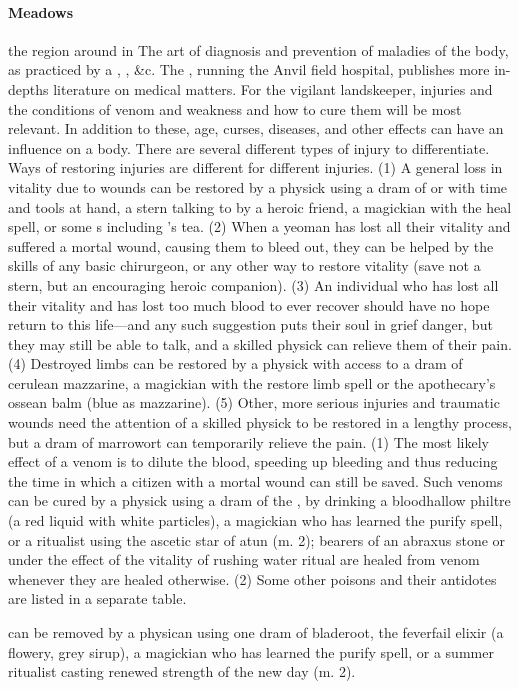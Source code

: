 \paragraph{Meadows} the region around  in 
 The art of diagnosis and prevention of maladies of the body, as practiced by a , ,  \&c. The , running the Anvil field hospital, publishes more in-depths literature on medical matters. For the vigilant landskeeper, injuries and the conditions of venom and weakness and how to cure them will be most relevant. In addition to these, age, curses, diseases, and other effects can have an influence on a body. \localpar {} There are several different types of injury to differentiate. Ways of restoring injuries are different for different injuries. (1) A general loss in vitality due to wounds can be restored by a physick using a dram of  or with time and tools at hand, a stern talking to by a heroic friend, a magickian with the heal spell, or some s including 's tea. (2) When a yeoman has lost all their vitality and suffered a mortal wound, causing them to bleed out, they can be helped by the skills of any basic chirurgeon, or any other way to restore vitality (save not a stern, but an encouraging heroic companion). (3) An individual who has lost all their vitality and has lost too much blood to ever recover should have no hope return to this life—and any such suggestion puts their soul in grief danger, but they may still be able to talk, and a skilled physick can relieve them of their pain. (4) Destroyed limbs can be restored by a physick with access to a dram of cerulean mazzarine, a magickian with the restore limb spell or the apothecary's ossean balm (blue as mazzarine). (5) Other, more serious injuries and traumatic wounds need the attention of a skilled physick to be restored in a lengthy process, but a dram of marrowort can temporarily relieve the pain. \localpar {} (1) The most likely effect of a venom is to dilute the blood, speeding up bleeding and thus reducing the time in which a citizen with a mortal wound can still be saved. Such venoms can be cured by a physick using a dram of the  , by drinking a bloodhallow philtre  (a red liquid with white particles), a magickian who has learned the purify spell, or a  ritualist using the  ascetic star of atun (m. 2); bearers of an abraxus stone or under the effect of the vitality of rushing water ritual are healed from venom whenever they are healed otherwise. (2) Some other poisons and their antidotes are listed in a separate table.\par{} can be removed by a physican using one dram of bladeroot, the feverfail elixir (a flowery, grey sirup), a magickian who has learned the purify spell, or a summer ritualist casting renewed strength of the new day (m. 2).   \bigparagraphendtwiddle
